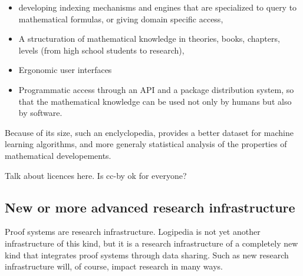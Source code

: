 \begin{itemize}
  \item developing indexing mechanisms and engines that are
    specialized to query to mathematical formulas, or giving domain
    specific access, 

  \item A structuration of mathematical knowledge in theories,
    books, chapters, levels (from high school students to research),

  \item Ergonomic user interfaces

  \item Programmatic access through an API and a package distribution
    system, so that the mathematical knowledge can be used not only by
    humans but also by software. 
\end{itemize}

Because of its size, such an enclyclopedia, provides a better dataset
for machine learning algorithms, and more generaly statistical
analysis of the properties of mathematical developements.

{\color{red} Talk about licences here. Is cc-by ok for everyone?}


\subsection{New or more advanced research infrastructure}

Proof systems are research infrastructure. {\sc Logipedia} is not yet
another infrastructure of this kind, but it is a research
infrastructure of a completely new kind that integrates proof systems
through data sharing.  Such as new research infrastructure will, of
course, impact research in many ways.


